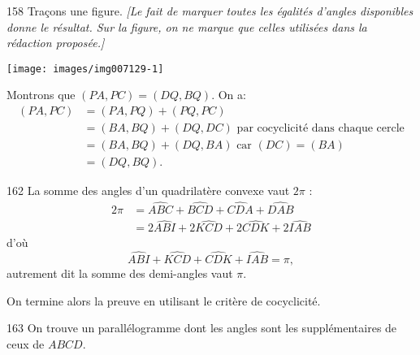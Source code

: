 \begin{Soln}{158}
  Traçons une figure. \emph{[Le fait de marquer toutes les égalités d'angles disponibles donne le résultat. Sur la figure, on ne marque que celles utilisées dans la rédaction proposée.]}
\begin{center}
\texttt{[image: images/img007129-1]}
\end{center}

Montrons que $(PA,PC)=(DQ,BQ)$. On a:
\begin{align*}
(PA,PC)&= (PA,PQ)+(PQ,PC) \\
&= (BA,BQ)+(DQ,DC) \text{ par cocyclicité dans chaque cercle}\\
&= (BA,BQ)+(DQ,BA) \text{ car $(DC)=(BA)$}\\
&= (DQ,BQ).
\end{align*}

\end{Soln}
\begin{Soln}{162}
La somme des angles d'un quadrilatère convexe vaut $2\pi$ :
\begin{align*}
2\pi &=
\widehat{ABC}+\widehat{BCD}+\widehat{CDA}+\widehat{DAB}\\
&= 2\widehat{ABI}
+2\widehat{KCD}+2\widehat{CDK}+2\widehat{IAB}
\end{align*}
d'où \[\widehat{ABI}
+\widehat{KCD}+\widehat{CDK}+\widehat{IAB}=\pi,\]
autrement dit la somme des demi-angles vaut $\pi$.

On termine alors la preuve en utilisant le critère de cocyclicité.

\end{Soln}
\begin{Soln}{163}
On trouve un parallélogramme dont les angles sont les supplémentaires de ceux de $ABCD$.
\end{Soln}
